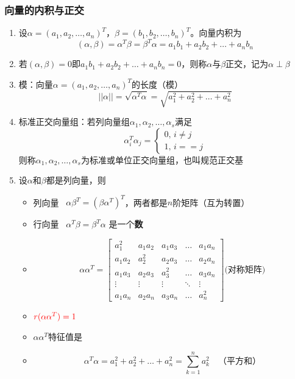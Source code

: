 \documentclass[./linear_algebra.tex]{subfiles}
\begin{document}
    \subsubsection{向量的内积与正交}

    \begin{enumerate}
        \item 设$\alpha = (a_1, a_2, \dots, a_n)^{T}$，$\beta = (b_1, b_2, \dots, b_n)^{T}$。向量内积为
        \[
            (\alpha, \beta) = \alpha^{T}\beta = \beta^{T}\alpha = a_{1}b_{1} + a_{2}b_{2} + \dots + a_{n}b_{n}
        \]
        \item 若$(\alpha, \beta) = 0$即$a_{1}b_{1} + a_{2}b_{2} + \dots + a_{n}b_{n} = 0$，则称$\alpha$与$\beta$正交，记为$\alpha \perp \beta$
        \item 模：向量$\alpha = (a_1, a_2, \dots, a_n)^{T}$的长度（模）
        \[
            ||\alpha|| = \sqrt{\alpha^T\alpha} = \sqrt {a_1^2 + a_2^2 + \dots + a_n^2}
        \]
        \item 标准正交向量组：若列向量组$\alpha_1, \alpha_2, \dots, \alpha_s$满足
        \[
            \alpha_i^T\alpha_j = \begin{cases}
                                     0, \, i \neq j \\
                                     1, \, i == j
            \end{cases}
        \]则称$\alpha_1, \alpha_2, \dots, \alpha_s$为标准或单位正交向量组，也叫规范正交基
        \item 设$\alpha$和$\beta$都是列向量，则
        \begin{itemize}
            \item 列向量 \cdot {} \, $\alpha\beta^T = (\beta\alpha^T)^T$，两者都是$n$阶矩阵（互为转置）
            \item 行向量 \cdot {} \, $\alpha^T\beta = \beta^T\alpha$ 是一个\textbf{数}
            \item
            \[
                \alpha\alpha^T =
                \begin{bmatrix}
                    a_1^2   & a_1 a_2 & a_1 a_3 & \dots  & a_1 a_n \\
                    a_1 a_2 & a_2^2   & a_2 a_3 & \dots  & a_2 a_n \\
                    a_1 a_3 & a_2 a_3 & a_3^2   & \dots  & a_3 a_n \\
                    \vdots  & \vdots  & \vdots  & \ddots & \vdots  \\
                    a_1 a_n & a_2 a_n & a_3 a_n & \dots  & a_n^2
                \end{bmatrix} \textbf{(对称矩阵)}
            \]
            \item $\color{red}{r(\alpha\alpha^T) = 1}$
            \item $\alpha\alpha^T$特征值是{}
            \item
            \[
                \alpha^T \alpha = a_1^2 + a_2^2 + \dots + a_n^2 = \sum_{k=1}^{n} a_k^2 \quad \text{（平方和）}
            \]
        \end{itemize}
    \end{enumerate}
\end{document}
